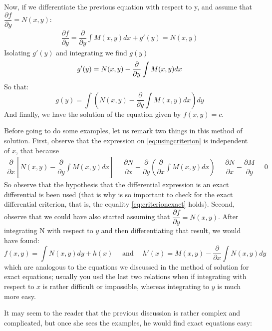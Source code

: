 Now, if we differentiate the previous equation with respect to y, and assume that $ \dfrac{\partial f}{\partial y} = N(x,y) $:
\begin{align*}
\dfrac{\partial f}{\partial y} = \dfrac{\partial}{\partial y} \int M(x,y)dx + g'(y) = N(x,y)
\end{align*}
Isolating $g'(y)$ and integrating we find $g(y)$
\begin{equation} \label{eq:usingcriterion}
g'(y) = N(x,y) - \dfrac{\partial}{\partial y }\int M(x,y)dx \\
\end{equation}
So that:
\begin{equation*}
g(y) = \int (N(x,y) - \dfrac{\partial}{\partial y }\int M(x,y)dx)dy
\end{equation*}
And finally, we have the solution  of the equation given by $f(x,y)=c$.

Before going to do some examples, let us remark two things in this method of solution.
First, observe that the expression on \eqref{eq:usingcriterion} is independent of $x$, that because
\begin{align*}
\dfrac{\partial}{\partial x} \left[ N(x,y) - \dfrac{\partial}{\partial y} \int M(x,y) dx \right] = \dfrac{\partial N}{\partial x} - \dfrac{\partial}{\partial y} \left(  \dfrac{\partial}{\partial x} \int M(x,y) dx \right) = \dfrac{\partial N}{\partial x} - \dfrac{\partial M}{\partial y} = 0
\end{align*} 
So observe that the hypothesis that the differential expression is an exact differential is been used (that is why is so important to check for the exact differential criterion, that is, the equality \eqref{eq:criterionexact} holds).
Second, observe that we could have also started assuming that $ \dfrac{\partial f}{\partial y } = N(x,y) $. After integrating N with respect to $y$ and then differentiating that result, we would have found:
\begin{equation*}
f(x,y) = \int N(x,y)dy + h(x) \quad \text{ and } \quad  h'(x) = M(x,y) - \dfrac{\partial}{\partial x} \int N(x,y)dy
\end{equation*}
which are analogous to the equations we discussed in the method of solution for exact equations; usually you usd the last two relations when if integrating with respect to $x$ is rather difficult or impossible, whereas integrating to $y$ is much more easy.

It may seem to the reader that the previous discussion is rather complex and complicated, but once  she sees the examples, he would find exact equations easy:

